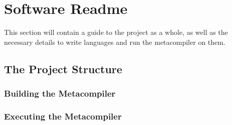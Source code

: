 \chapter{Software Readme} %
\label{cha:software_readme}
This section will contain a guide to the project as a whole, as well as the necessary details to write languages and run the metacompiler on them.

\section{The Project Structure} %
\label{sec:the_project_structure}


\subsection{Building the Metacompiler} %
\label{sub:building_the_metacompiler}


\subsection{Executing the Metacompiler} %
\label{sub:executing_the_metacompiler}


